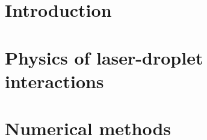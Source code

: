 \documentclass{report}
\begin{document}
\tableofcontents

\pagebreak


\chapter{Introduction}

\chapter{Physics of laser-droplet interactions}
\label{chpt:numerical_droplet}


\chapter{Numerical methods}

% 

% 

% 

% 

% 

% 

% 

\printbibliography
\end{document}
